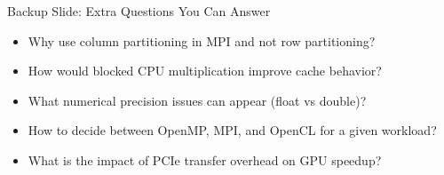 \documentclass[aspectratio=169]{beamer}
\begin{document}
\begin{frame}{Backup Slide: Extra Questions You Can Answer}
\begin{itemize}
  \item Why use column partitioning in MPI and not row partitioning?
  \item How would blocked CPU multiplication improve cache behavior?
  \item What numerical precision issues can appear (float vs double)?
  \item How to decide between OpenMP, MPI, and OpenCL for a given workload?
  \item What is the impact of PCIe transfer overhead on GPU speedup?
\end{itemize}
\end{frame}
\end{document}
